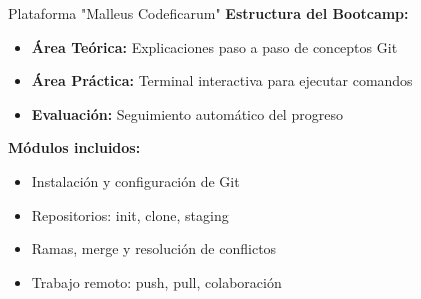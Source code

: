 \documentclass[t]{beamer}
\begin{document}
\begin{frame}{Plataforma "Malleus Codeficarum"}
    \textbf{Estructura del Bootcamp:}
    \begin{itemize}
        \item \textbf{Área Teórica:} Explicaciones paso a paso de conceptos Git
        \item \textbf{Área Práctica:} Terminal interactiva para ejecutar comandos
        \item \textbf{Evaluación:} Seguimiento automático del progreso
    \end{itemize}
    
    \vspace{0.3cm}
    
    \textbf{Módulos incluidos:}
    \begin{itemize}
        \item Instalación y configuración de Git
        \item Repositorios: init, clone, staging
        \item Ramas, merge y resolución de conflictos
        \item Trabajo remoto: push, pull, colaboración
    \end{itemize}
    
    \vspace{0.3cm}
    
\end{frame}
\end{document}
